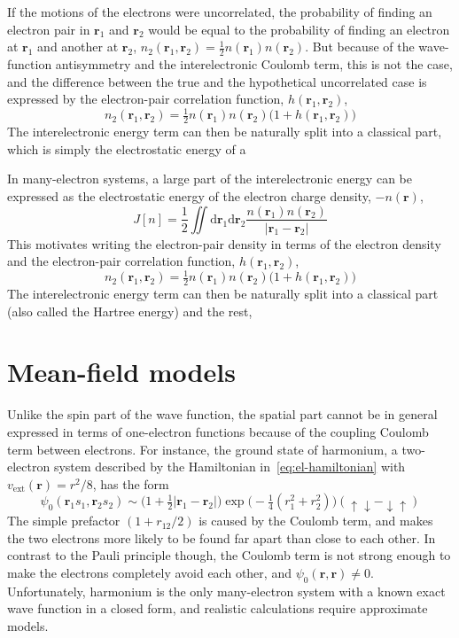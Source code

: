 If the motions of the electrons were uncorrelated, the probability of finding an electron pair in $\mathbf r_1$ and $\mathbf r_2$ would be equal to the probability of finding an electron at $\mathbf r_1$ and another at $\mathbf r_2$, $n_2(\mathbf r_1,\mathbf r_2)=\frac12 n(\mathbf r_1)n(\mathbf r_2)$.
But because of the wave-function antisymmetry and the interelectronic Coulomb term, this is not the case, and the difference between the true and the hypothetical uncorrelated case is expressed by the electron-pair correlation function, $h(\mathbf r_1,\mathbf r_2)$,
\begin{equation}
  n_2(\mathbf r_1,\mathbf r_2)=\tfrac12 n(\mathbf r_1)n(\mathbf r_2)\big(1+h(\mathbf r_1,\mathbf r_2)\!\big)
\end{equation}
The interelectronic energy term can then be naturally split into a classical part, which is simply the electrostatic energy of a 

In many-electron systems, a large part of the interelectronic energy can be expressed as the electrostatic energy of the electron charge density, $-n(\mathbf r)$,
\begin{equation}
  J[n]=\frac12\iint\mathrm d\mathbf r_1\mathrm d\mathbf r_2\frac{n(\mathbf r_1)n(\mathbf r_2)}{|\mathbf r_1-\mathbf r_2|}
\end{equation}
This motivates writing the electron-pair density in terms of the electron density and the electron-pair correlation function, $h(\mathbf r_1,\mathbf r_2)$,
\begin{equation}
  n_2(\mathbf r_1,\mathbf r_2)=\tfrac12 n(\mathbf r_1)n(\mathbf r_2)\big(1+h(\mathbf r_1,\mathbf r_2)\!\big)
\end{equation}
The interelectronic energy term can then be naturally split into a classical part (also called the Hartree energy) and the rest, 


\section{Mean-field models}

Unlike the spin part of the wave function, the spatial part cannot be in general expressed in terms of one-electron functions because of the coupling Coulomb term between electrons.
For instance, the ground state of harmonium, a two-electron system described by the Hamiltonian in~\eqref{eq:el-hamiltonian} with $v_\text{ext}(\mathbf r)=r^2/8$, has the form
\begin{equation}
  \psi_0(\mathbf r_1s_1,\mathbf r_2s_2)\sim\big(1+\tfrac12|\mathbf r_1-\mathbf r_2|\big)\exp\big(-\tfrac14(r_1^2+r_2^2)\big)(\uparrow\downarrow-\downarrow\uparrow)
\end{equation}
The simple prefactor $(1+r_{12}/2)$ is caused by the Coulomb term, and makes the two electrons more likely to be found far apart than close to each other.
In contrast to the Pauli principle though, the Coulomb term is not strong enough to make the electrons completely avoid each other, and $\psi_0(\mathbf r,\mathbf r)\neq0$.
Unfortunately, harmonium is the only many-electron system with a known exact wave function in a closed form, and realistic calculations require approximate models.

